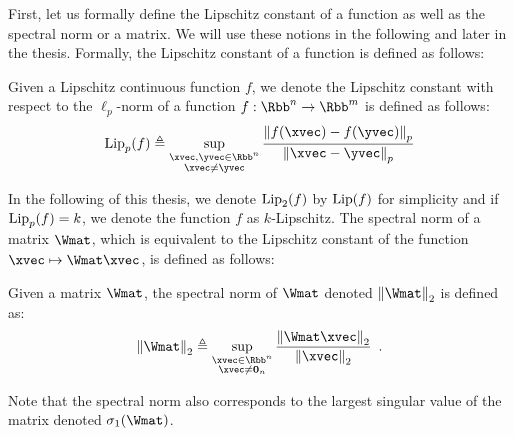 First, let us formally define the Lipschitz constant of a function as well as the spectral norm or a matrix.
We will use these notions in the following and later in the thesis.
Formally, the Lipschitz constant of a function is defined as follows: 
\begin{definition} \label{definition:ch2-lipschitz_constant}
  Given a Lipschitz continuous function $f$, we denote the Lipschitz constant with respect to the $\ell_p$-norm of a function $f: \Rbb^n \rightarrow \Rbb^m$ is defined as follows:
  \begin{equation}
  \lipp{p}{f} \triangleq \sup_{\substack{\xvec, \yvec \in \Rbb^n \\ \xvec \neq \yvec}} \frac{\norm{f(\xvec) - f(\yvec)}_p}{\norm{\xvec - \yvec}_p}
  \end{equation}
  \removespace
\end{definition}
\noindent
In the following of this thesis, we denote $\lipp{2}{f}$ by $\lip{f}$ for simplicity and if $\lipp{p}{f}=k$, we denote the function $f$ as $k$-Lipschitz.
The spectral norm of a matrix $\Wmat$, which is equivalent to the Lipschitz constant of the function $\xvec \mapsto \Wmat \xvec$, is defined as follows:
\begin{definition} \label{defintion:ch2-spectral_norm}
Given a matrix $\Wmat$, the spectral norm of $\Wmat$ denoted $\norm{\Wmat}_2$ is defined as:
  \begin{equation}
    \norm{\Wmat}_2 \triangleq \sup_{\substack{\xvec \in \Rbb^n \\ \xvec \neq \zerovec{n}}} \frac{\norm{\Wmat \xvec}_2}{\norm{\xvec}_2} \enspace.
  \end{equation}
  \removespace
\end{definition}
\noindent
Note that the spectral norm also corresponds to the largest singular value of the matrix denoted $\sigma_1(\Wmat)$.

